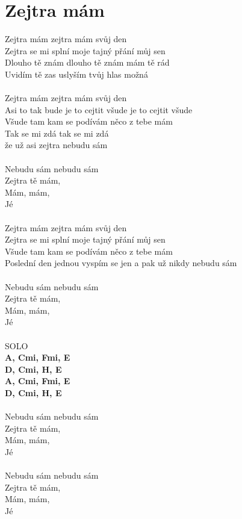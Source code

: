 \section{Zejtra mám}
Zejtra mám zejtra mám svůj den\\
Zejtra se mi splní moje tajný přání můj sen\\
Dlouho tě znám dlouho tě znám mám tě rád\\
Uvidím tě zas uslyším tvůj hlas možná\\
\\
Zejtra mám zejtra mám svůj den\\
Asi to tak bude je to cejtit všude je to cejtit všude\\
Všude tam kam se podívám něco z tebe mám\\
Tak se mi zdá tak se mi zdá\\
že už asi zejtra nebudu sám\\
\\
Nebudu sám nebudu sám\\
Zejtra tě mám,\\
Mám, mám,\\
Jé\\
\\
Zejtra mám zejtra mám svůj den\\
Zejtra se mi splní moje tajný přání můj sen\\
Všude tam kam se podívám něco z tebe mám\\
Poslední den jednou vyspím se jen a pak už nikdy nebudu sám\\
\\
Nebudu sám nebudu sám\\
Zejtra tě mám,\\
Mám, mám,\\
Jé\\
\\
SOLO\\
\footnotesize\textbf{A, C\kr mi, F\kr mi, E}\\
\footnotesize\textbf{D, C\kr mi, H, E}\\
\footnotesize\textbf{A, C\kr mi, F\kr mi, E}\\
\footnotesize\textbf{D, C\kr mi, H, E}\\
\normalsize
\\
Nebudu sám nebudu sám\\
Zejtra tě mám,\\
Mám, mám,\\
Jé\\
\\
Nebudu sám nebudu sám\\
Zejtra tě mám,\\
Mám, mám,\\
Jé